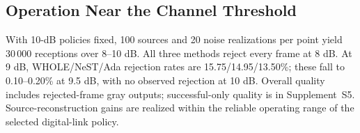 \subsection{Operation Near the Channel Threshold}
With 10-dB policies fixed, 100 sources and 20 noise realizations per point yield 30\,000 receptions over 8--10 dB. All three methods reject every frame at 8 dB. At 9 dB, WHOLE/NeST/Ada rejection rates are 15.75/14.95/13.50\%; these fall to 0.10--0.20\% at 9.5 dB, with no observed rejection at 10 dB. Overall quality includes rejected-frame gray outputs; successful-only quality is in Supplement~S5. Source-reconstruction gains are realized within the reliable operating range of the selected digital-link policy.
